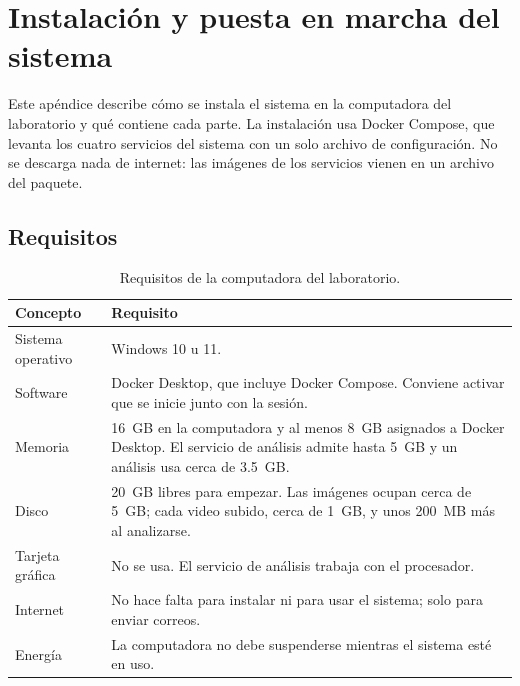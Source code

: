 
\chapter{Instalación y puesta en marcha del sistema}
\label{ap:instalacion}

Este apéndice describe cómo se instala el sistema en la computadora del laboratorio
y qué contiene cada parte. La instalación usa Docker Compose, que levanta los cuatro
servicios del sistema con un solo archivo de configuración. No se descarga nada de
internet: las imágenes de los servicios vienen en un archivo del paquete.

\section{Requisitos}

\begin{table}[H]
\centering
\caption{Requisitos de la computadora del laboratorio.}
\label{tab:ap_requisitos}
\begin{tabular}{|p{3.6cm}|p{10.2cm}|}
\hline
\textbf{Concepto} & \textbf{Requisito} \\
\hline
Sistema operativo & Windows 10 u 11. \\
\hline
Software & Docker Desktop, que incluye Docker Compose. Conviene activar que se
inicie junto con la sesión. \\
\hline
Memoria & 16~GB en la computadora y al menos 8~GB asignados a Docker Desktop. El
servicio de análisis admite hasta 5~GB y un análisis usa cerca de 3.5~GB. \\
\hline
Disco & 20~GB libres para empezar. Las imágenes ocupan cerca de 5~GB; cada video
subido, cerca de 1~GB, y unos 200~MB más al analizarse. \\
\hline
Tarjeta gráfica & No se usa. El servicio de análisis trabaja con el procesador. \\
\hline
Internet & No hace falta para instalar ni para usar el sistema; solo para enviar
correos. \\
\hline
Energía & La computadora no debe suspenderse mientras el sistema esté en uso. \\
\hline
\end{tabular}
\end{table}

